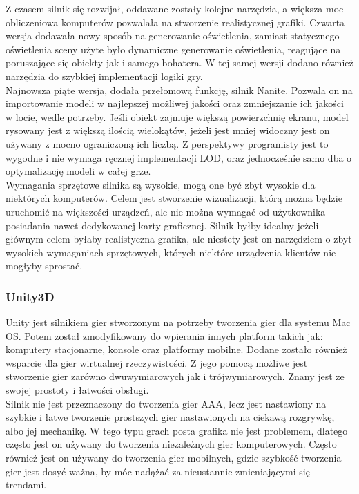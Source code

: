 \documentclass{article} %
\begin{document}
        Z czasem silnik się rozwijał, oddawane zostały kolejne narzędzia, a większa moc obliczeniowa komputerów pozwalała na stworzenie realistycznej grafiki. Czwarta wersja dodawała nowy sposób na generowanie oświetlenia, zamiast statycznego oświetlenia sceny użyte było dynamiczne generowanie oświetlenia, reagujące na poruszające się obiekty jak i samego bohatera. W tej samej wersji dodano również narzędzia do szybkiej implementacji logiki gry.
        \\
        
        Najnowsza piąte wersja, dodała przełomową funkcję, silnik Nanite. Pozwala on na importowanie modeli w najlepszej możliwej jakości oraz zmniejszanie ich jakości w locie, wedle potrzeby. Jeśli obiekt zajmuje większą powierzchnię ekranu, model rysowany jest z większą ilością wielokątów, jeżeli jest mniej widoczny jest on używany z mocno ograniczoną ich liczbą. \cite{unreal} Z perspektywy programisty jest to wygodne i nie wymaga ręcznej implementacji LOD, oraz jednocześnie samo dba o optymalizację modeli w całej grze.
        \\
        
        Wymagania sprzętowe silnika są wysokie, mogą one być zbyt wysokie dla niektórych komputerów. Celem jest stworzenie wizualizacji, którą można będzie uruchomić na większości urządzeń, ale nie można wymagać od użytkownika posiadania nawet dedykowanej karty graficznej. Silnik byłby idealny jeżeli głównym celem byłaby realistyczna grafika, ale niestety jest on narzędziem o zbyt wysokich wymaganiach sprzętowych, których niektóre urządzenia klientów nie mogłyby sprostać.
        \\
        
        \subsubsection*{Unity3D}
        Unity jest silnikiem gier stworzonym na potrzeby tworzenia gier dla systemu Mac OS. Potem został zmodyfikowany do wpierania innych platform takich jak: komputery stacjonarne, konsole oraz platformy mobilne. Dodane zostało również wsparcie dla gier wirtualnej rzeczywistości. Z jego pomocą możliwe jest stworzenie gier zarówno dwuwymiarowych jak i trójwymiarowych. Znany jest ze swojej prostoty i łatwości obsługi.
        \\
        
        Silnik nie jest przeznaczony do tworzenia gier AAA, lecz jest nastawiony na szybkie i łatwe tworzenie prostszych gier nastawionych na ciekawą rozgrywkę, albo jej mechanikę. W tego typu grach posta grafika nie jest problemem, dlatego często jest on używany do tworzenia niezależnych gier komputerowych. Często również jest on używany do tworzenia gier mobilnych, gdzie szybkość tworzenia gier jest dosyć ważna, by móc nadążać za nieustannie zmieniającymi się trendami.
        \\
        
\end{document}
